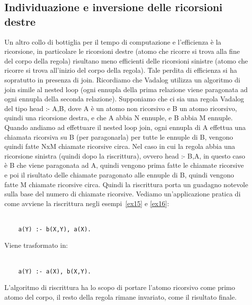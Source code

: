 \subsection{Individuazione e inversione delle ricorsioni destre}

Un altro collo di bottiglia per il tempo di computazione e l'efficienza è la ricorsione, in particolare le ricorsioni destre (atomo che ricorre si trova alla fine del corpo della regola) risultano meno efficienti delle ricorsioni sinistre (atomo che ricorre si trova all'inizio del corpo della regola). \newline
Tale perdita di efficienza si ha sopratutto in presenza di join. Ricordiamo che Vadalog utilizza un algoritmo di join simile al nested loop (ogni ennupla della prima relazione viene paragonata ad ogni ennupla della seconda relazione). \newline
Supponiamo che ci sia una regola Vadalog del tipo head :- A,B, dove A è un atomo non ricorsivo e B un atomo ricorsivo, quindi una ricorsione destra, e che A abbia N ennuple, e B abbia M ennuple. \newline
Quando andiamo ad effettuare il nested loop join, ogni ennupla di A effettua una chiamata ricorsiva su B (per paragonarla) per tutte le ennuple di B, vengono quindi fatte NxM chiamate ricorsive circa. \newline
Nel caso in cui la regola abbia una ricorsione sinistra (quindi dopo la riscrittura), ovvero head :- B,A, in  questo caso è B che viene paragonata ad A, quindi vengono prima fatte le chiamate ricorsive e poi il risultato delle chiamate paragonato alle ennuple di B, quindi vengono fatte M chiamate ricorsive circa. Quindi la riscrittura porta un guadagno notevole sulla base del numero di chiamate ricorsive. \newline
Vediamo un'applicazione pratica di come avviene la riscrittura negli esempi~\ref{ex15} e \ref{ex16}: 
\begin{example}\label{ex15}
	\begin{lstlisting}
	
	a(Y) :- b(X,Y), a(X).
	\end{lstlisting}
\end{example}
Viene trasformato in:
\begin{example}\label{ex16}
	\begin{lstlisting}
	
	a(Y) :- a(X), b(X,Y).
	\end{lstlisting}
\end{example}
L'algoritmo di riscrittura ha lo scopo di portare l'atomo ricorsivo come primo atomo del corpo, il resto della regola rimane invariato, come il risultato finale.

